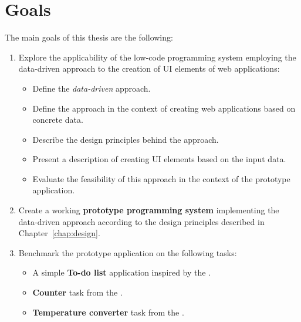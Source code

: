 \section*{Goals}
The main goals of this thesis are the following:
\begin{enumerate}
	\item Explore the applicability of the low-code programming system employing the data-driven approach to the creation of UI elements of web applications:
	      \begin{itemize}
		      \item Define the \emph{data-driven} approach.
		      \item Define the approach in the context of creating web applications based on concrete data.
		      \item Describe the design principles behind the approach.
		      \item Present a description of creating UI elements based on the input data.
		      \item Evaluate the feasibility of this approach in the context of the prototype application.
	      \end{itemize}
	\item Create a working \textbf{prototype programming system} implementing the data-driven approach according to the design principles described in Chapter~\ref{chap:design}.
	\item Benchmark the prototype application on the following tasks:
	      \begin{itemize}
		      \item A simple \textbf{To-do list} application inspired by the \citet{TodoMVC}.
		      \item \textbf{Counter} task from the \citet{7GUIs-web}.
		      \item \textbf{Temperature converter} task from the \citet{7GUIs-web}.
	      \end{itemize}
\end{enumerate}

\newpage
